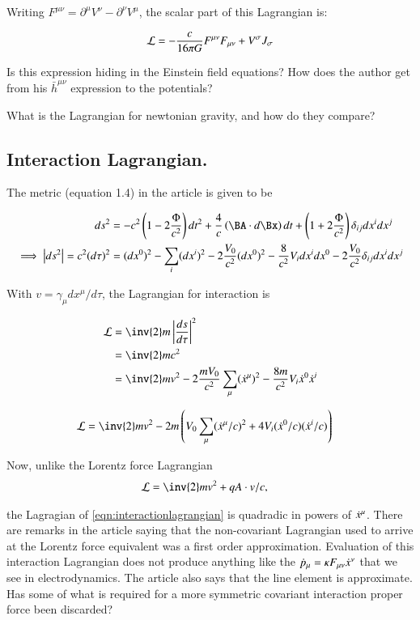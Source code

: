 \documentclass{article}
\newcommand{\barh}[0]{\bar{h}}
\begin{document}
Writing $F^{\mu\nu} = \partial^\mu V^\nu - \partial^\nu V^\mu$, the scalar part of this Lagrangian is:

\begin{align*}
\mathcal{L} &= -\frac{c}{16 \pi G} F^{\mu\nu} F_{\mu\nu} + V^\sigma J_\sigma \\
\end{align*}

Is this expression hiding in the Einstein field equations?  How does the 
author get from his $\barh^{\mu\nu}$ expression to the potentials?

What is the Lagrangian for newtonian gravity, and how do they compare?

\subsection{ Interaction Lagrangian. }

The metric (equation 1.4) in the article is given to be

\begin{align*}
ds^2 &= 
-c^2\left(1 - 2 \frac{\Phi}{c^2}\right) dt^2
+\frac{4}{c}\left(\BA \cdot d\Bx \right) dt 
+\left(1 + 2 \frac{\Phi}{c^2}\right) \delta_{ij}dx^i dx^j \\
\implies
\Abs{ds^2} = c^2 (d\tau)^2 &= (dx^0)^2 - \sum_i (dx^i)^2
-2 \frac{V_0}{c^2} (dx^0)^2
-\frac{8}{c^2} V_i dx^i dx^0
- 2 \frac{V_0}{c^2} \delta_{ij}dx^i dx^j
\end{align*}

With $v = \gamma_\mu dx^\mu/d\tau$, the Lagrangian for interaction is

\begin{align*}
\LL 
&= \inv{2} m \Abs{\frac{ds}{d\tau}}^2  \\
&= \inv{2} m c^2 \\
&= \inv{2} m v^2 -2 \frac{m V_0}{c^2} \sum_\mu (\xdot^\mu)^2 -\frac{8 m}{c^2} V_i \xdot^0 \xdot^i  \\
\end{align*}

\begin{align}\label{eqn:interactionlagrangian}
\LL &= \inv{2} m v^2 - 2m \left( V_0 \sum_\mu (\xdot^\mu / c)^2 + 4 V_i (\xdot^0/c) (\xdot^i/c) \right)
\end{align}

Now, unlike the Lorentz force Lagrangian
\begin{align*}
\LL &= \inv{2} m v^2 + q A \cdot v/c,
\end{align*}

the Lagragian of \ref{eqn:interactionlagrangian} is quadradic in powers of $\dot{x}^\mu$.  
There are remarks in the article saying that the non-covariant Lagrangian used to arrive at the Lorentz force equivalent was a first order approximation.
Evaluation of this interaction Lagrangian does not produce anything like the 
$\dot{p}_\mu = \kappa F_{\mu\nu}\dot{x}^\nu$ that we see in electrodynamics.
The article also says that the line element is approximate.
Has some of what
is required for a more symmetric covariant interaction proper force been
discarded?



\end{document}
